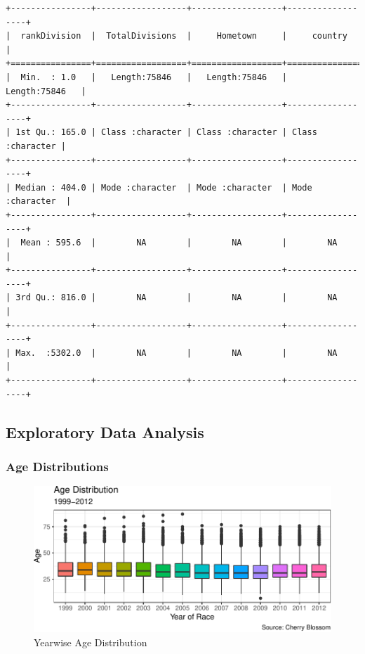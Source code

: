 \documentclass[
]{article}
\begin{document}
\begin{verbatim}
+----------------+------------------+------------------+------------------+
|  rankDivision  |  TotalDivisions  |     Hometown     |     country      |
+================+==================+==================+==================+
|  Min.  : 1.0   |   Length:75846   |   Length:75846   |   Length:75846   |
+----------------+------------------+------------------+------------------+
| 1st Qu.: 165.0 | Class :character | Class :character | Class :character |
+----------------+------------------+------------------+------------------+
| Median : 404.0 | Mode :character  | Mode :character  | Mode :character  |
+----------------+------------------+------------------+------------------+
|  Mean : 595.6  |        NA        |        NA        |        NA        |
+----------------+------------------+------------------+------------------+
| 3rd Qu.: 816.0 |        NA        |        NA        |        NA        |
+----------------+------------------+------------------+------------------+
| Max.  :5302.0  |        NA        |        NA        |        NA        |
+----------------+------------------+------------------+------------------+
\end{verbatim}

\newpage

\hypertarget{exploratory-data-analysis}{%
\subsection{Exploratory Data Analysis}\label{exploratory-data-analysis}}

\hypertarget{age-distributions}{%
\subsubsection{Age Distributions}\label{age-distributions}}

\begin{figure}[H]

{\centering \includegraphics{case_study02_files/figure-latex/unnamed-chunk-12-1} 

}

\caption{Yearwise Age Distribution}\label{fig:unnamed-chunk-12}
\end{figure}
\end{document}
